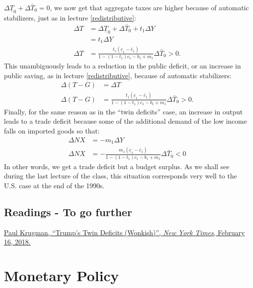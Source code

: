 \documentclass[]{book}
\begin{document}
\(\Delta\underline{T}_{0}+\Delta\bar{T}_{0}=0\), we now get that
aggregate taxes are higher because of automatic stabilizers, just as in
lecture \ref{redistributive}: \[
\begin{aligned}
\Delta T&=\Delta\underline{T}_{0}+\Delta\bar{T}_{0}+t_1\Delta Y\\
&=t_1 \Delta Y\\
\Delta T&=\frac{t_1\left(\underline{c}_{1}-\bar{c}_{1}\right)}{1-\left(1-t_{1}\right)c_{1}-b_{1}+m_1}\Delta\bar{T}_{0}>0.
\end{aligned}
\] This unambiguously leads to a reduction in the public deficit, or an
increase in public saving, as in lecture \ref{redistributive}, because
of automatic stabilizers: \[
\begin{aligned}
\Delta\left(T-G\right)&=\Delta T \\
\Delta\left(T-G\right)&=\frac{t_1\left(\underline{c}_{1}-\bar{c}_{1}\right)}{1-\left(1-t_{1}\right)c_{1}-b_{1}+m_1}\Delta\bar{T}_{0}>0.
\end{aligned}
\] Finally, for the same reason as in the ``twin deficits'' case, an
increase in output leads to a trade deficit because some of the
additional demand of the low income falls on imported goods so that: \[
\begin{aligned}
\Delta NX &= -m_1\Delta Y\\
\Delta NX &=- \frac{m_1\left(\underline{c}_{1}-\bar{c}_{1}\right)}{1-\left(1-t_{1}\right)c_{1}-b_{1}+m_1}\Delta\bar{T}_{0}<0
\end{aligned}
\] In other words, we get a trade deficit but a budget surplus. As we
shall see during the last lecture of the class, this situation
corresponds very well to the U.S. case at the end of the 1990s.

\section*{Readings - To go further}\label{readings---to-go-further-10}

\href{https://search.proquest.com/nytimes/docview/2002526277/AF5280E4BCB54A41PQ}{Paul
Krugman, ``Trump's Twin Deficits (Wonkish)'', \emph{New York Times},
February 16, 2018.}

\chapter{Monetary Policy}\label{monetary-policy}
\end{document}
